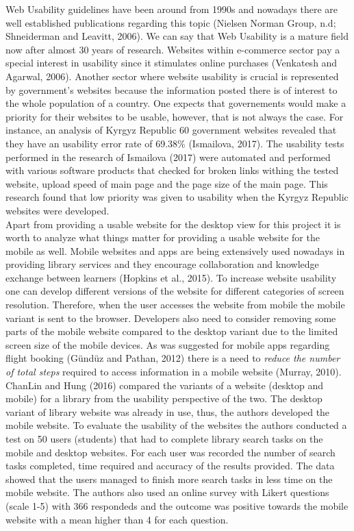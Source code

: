 \documentclass[version=last,fontsize=13pt]{scrartcl}
\begin{document}
\indent
Web Usability guidelines have been around from 1990s and nowadays there are well established publications regarding this topic (Nielsen Norman Group, n.d; Shneiderman and Leavitt, 2006). We can say that Web Usability is a mature field now after almost 30 years of research. Websites within e-commerce sector pay a special interest in usability since it stimulates online purchases (Venkatesh and Agarwal, 2006). Another sector where website usability is crucial is represented by government's websites because the information posted there is of interest to the whole population of a country. One expects that governements would make a priority for their websites to be usable, however, that is not always the case. For instance, an analysis of Kyrgyz Republic 60 government websites revealed that they have an usability error rate of 69.38\% (Ismailova, 2017). The usability tests performed in the research of Ismailova (2017) were automated and performed with various software products that checked for broken links withing the tested website, upload speed of main page  and the page size of the main page. This research found that low priority was given to usability when the Kyrgyz Republic websites were developed.\\
\indent
	Apart from providing a usable website for the desktop view for this project it is worth to analyze what things matter for providing a usable website for the mobile  as well. Mobile websites and apps are being extensively used nowadays in providing library services and they encourage collaboration and knowledge exchange between learners (Hopkins et al., 2015). To increase website usability one can develop different versions of the  website for different categories of screen resolution. Therefore, when the user accesses the website from mobile the mobile variant is sent to the browser. Developers also need to consider removing some parts of the mobile website compared to the desktop variant due to the limited screen size of the mobile devices. As was suggested for mobile apps regarding flight booking (Gündüz and Pathan, 2012) there is a need to \textit{reduce the number of total steps} required to access information in a mobile website (Murray, 2010).\\
ChanLin and Hung (2016) compared the variants of a website (desktop and mobile) for a library from the usability perspective of the two. The desktop variant of library website was already in use, thus, the authors developed the mobile website. To evaluate the usability of the websites the authors conducted a test on 50 users (students) that had to  complete library search tasks on the mobile and desktop websites. For each user was recorded the number of search tasks completed, time required and accuracy of the results provided. The data showed that the users managed to finish more search tasks in less time on the mobile website. The authors also used an online survey with Likert questions (scale 1-5) with 366 respondeds and the outcome was positive towards the mobile website with a mean higher than 4 for each question.
\end{document}
